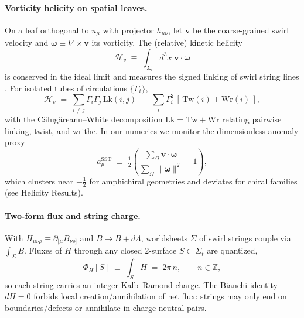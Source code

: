 \documentclass[11pt, preprint,titlepage]{revtex4-2}
\begin{document}
	\paragraph{Vorticity helicity on spatial leaves.}
	On a leaf orthogonal to \(u_\mu\) with projector \(h_{\mu\nu}\), let \(\mathbf{v}\) be the coarse-grained swirl velocity and \(\boldsymbol{\omega}\equiv\nabla\times\mathbf{v}\) its vorticity. The (relative) kinetic helicity
	\begin{equation}
		\mathcal{H}_{\!v} \;\equiv\; \int_{\Sigma_t} d^3x\; \mathbf{v}\cdot\boldsymbol{\omega}
	\end{equation}
	is conserved in the ideal limit and measures the signed linking of swirl string lines \cite{Moffatt1969,Arnold1998}.
	For isolated tubes of circulations \(\{\Gamma_i\}\),
	\begin{equation}
		\mathcal{H}_{\!v} \;=\; \sum_{i\neq j} \Gamma_i\Gamma_j\,\mathrm{Lk}(i,j)\;+\;\sum_i \Gamma_i^2\,[\,\mathrm{Tw}(i)+\mathrm{Wr}(i)\,],
		\label{eq:calug}
	\end{equation}
	with the Călugăreanu--White decomposition \(\mathrm{Lk}=\mathrm{Tw}+\mathrm{Wr}\) relating pairwise linking, twist, and writhe. In our numerics we monitor the dimensionless anomaly proxy
	\begin{equation}
		a_\mu^{\mathrm{SST}} \;\equiv\; \tfrac12\!\left(\frac{\sum_{\Omega}\mathbf{v}\!\cdot\!\boldsymbol{\omega}}{\sum_{\Omega}\|\boldsymbol{\omega}\|^2}-1\right),
	\end{equation}
	which clusters near \(-\tfrac12\) for amphichiral geometries and deviates for chiral families (see Helicity Results).

	\paragraph{Two-form flux and string charge.}
	With \(H_{\mu\nu\rho}\equiv\partial_{[\mu}B_{\nu\rho]}\) and \(B\mapsto B+d\Lambda\),
	worldsheets \(\Sigma\) of swirl strings couple via \(\int_\Sigma B\).
	Fluxes of \(H\) through any closed 2-surface \(S\subset\Sigma_t\) are quantized,
	\begin{equation}
		\Phi_H[S] \;\equiv\; \int_S H \;=\; 2\pi\,n,\qquad n\in\mathbb{Z},
	\end{equation}
	so each string carries an integer Kalb--Ramond charge. The Bianchi identity \(dH=0\) forbids local creation/annihilation of net flux: strings may only end on boundaries/defects or annihilate in charge-neutral pairs.
\end{document}
